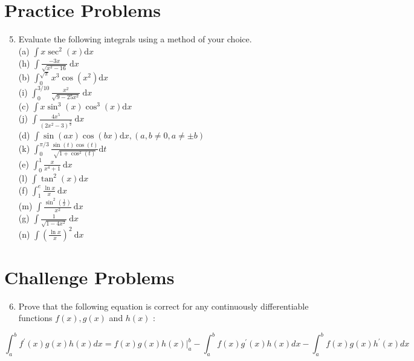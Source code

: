 \documentclass[10pt]{article}
\begin{document}
\section*{Practice Problems}
\begin{enumerate}
  \setcounter{enumi}{4}
  \item Evaluate the following integrals using a method of your choice.\\
(a) $\int x \sec ^{2}(x) \mathrm{d} x$\\
(h) $\int \frac{-3 x}{\sqrt{x^{2}-16}} \mathrm{~d} x$\\
(b) $\int_{0}^{\sqrt{\pi}} x^{3} \cos \left(x^{2}\right) \mathrm{d} x$\\
(i) $\int_{0}^{3 / 10} \frac{x^{2}}{\sqrt{9-25 x^{2}}} \mathrm{~d} x$\\
(c) $\int x \sin ^{3}(x) \cos ^{3}(x) \mathrm{d} x$\\
(j) $\int \frac{4 x^{5}}{\left(2 x^{2}-3\right)^{\frac{3}{2}}} \mathrm{~d} x$\\
(d) $\int \sin (a x) \cos (b x) \mathrm{d} x,(a, b \neq 0, a \neq \pm b)$\\
(k) $\int_{0}^{\pi / 3} \frac{\sin (t) \cos (t)}{\sqrt{1+\cos ^{2}(t)}} \mathrm{d} t$\\
(e) $\int_{0}^{1} \frac{x}{x^{4}+1} \mathrm{~d} x$\\
(l) $\int \tan ^{2}(x) \mathrm{d} x$\\
(f) $\int_{1}^{e} \frac{\ln x}{x} \mathrm{~d} x$\\
(m) $\int \frac{\sin ^{2}\left(\frac{1}{x}\right)}{x^{2}} \mathrm{~d} x$\\
(g) $\int \frac{1}{\sqrt{1-4 x^{2}}} \mathrm{~d} x$\\
(n) $\int\left(\frac{\ln x}{x}\right)^{2} \mathrm{~d} x$
\end{enumerate}

\section*{Challenge Problems}
\begin{enumerate}
  \setcounter{enumi}{5}
  \item Prove that the following equation is correct for any continuously differentiable functions $f(x), g(x)$ and $h(x)$ :
\end{enumerate}

$$
\int_{a}^{b} f^{\prime}(x) g(x) h(x) d x=\left.f(x) g(x) h(x)\right|_{a} ^{b}-\int_{a}^{b} f(x) g^{\prime}(x) h(x) d x-\int_{a}^{b} f(x) g(x) h^{\prime}(x) d x
$$
\end{document}
